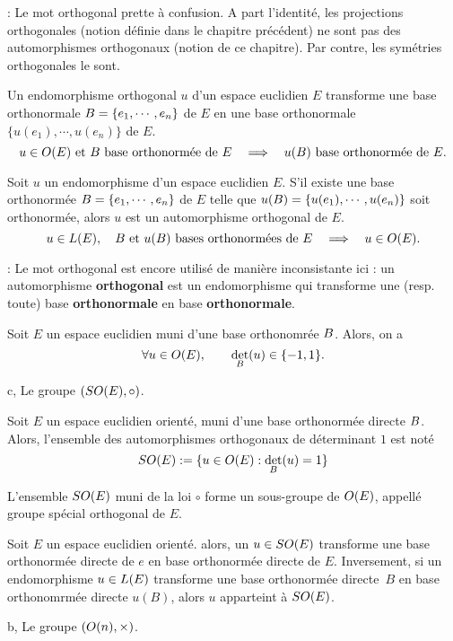  \Remarque : Le mot orthogonal prette à confusion. A part l'identité, les projections orthogonales (notion définie dans le chapitre précédent) ne sont pas des automorphismes orthogonaux (notion de ce chapitre). Par contre, les symétries orthogonales le sont. 
\bigskip

\Propriete []  Un endomorphisme orthogonal $u$ d'un espace euclidien $E$ transforme une base orthonormale $\sc B=\{e_1,\cdots,e_n\}$ de $E$ en une base orthonormale $\{u(e_1),\cdots,u(e_n)\}$ de $E$. 
$$
u\in\sc O(E)\mbox{ et }\sc B\mbox{ base orthonormée de }E\quad \Longrightarrow\quad u(\sc B)\mbox{ base orthonormée de }E.
$$
 

\Propriete []  Soit $u$ un endomorphisme d'un espace euclidien $E$. S'il existe une base orthonormée $\sc B=\{e_1,\cdots,e_n\}$ de $E$ telle que 
$u(\sc B)=\{u(e_1),\cdots,u(e_n)\}$ soit orthonormée, alors $u$ est un automorphisme orthogonal de $E$. 
$$
u\in\sc L(E), \quad \sc B\mbox{ et }u(\sc B)\mbox{ bases orthonormées de }E\quad \Longrightarrow\quad u\in\sc O(E).
$$

 \Remarque :  Le mot orthogonal est encore utilisé de manière inconsistante ici : un automorphisme {\bf orthogonal} est un endomorphisme qui transforme une (resp. toute) base {\bf orthonormale} en base {\bf orthonormale}. 
\bigskip

\Propriete []  Soit $E$ un espace euclidien muni d'une base orthonomrée $\sc B$. Alors, on a 
$$
\forall u\in\sc O(E), \qquad \det_{\sc B}(u)\in\{-1,1\}. 
$$

\Subsection c, Le groupe $(\sc{SO}(E),\circ)$. 

\Definition []  Soit $E$ un espace euclidien orienté, muni d'une base orthonormée directe $\sc B$. 
Alors, l'ensemble des automorphismes orthogonaux de déterminant $1$ est noté 
$$
\sc{SO}(E):=\{u\in\sc O(E):\det_{\sc B}(u)=1\}
$$

\Propriete []  L'ensemble $\sc{SO}(E)$ muni de la loi $\circ$ forme un sous-groupe de $\sc O(E)$, 
appellé groupe spécial orthogonal de $E$. 
\bigskip

\Propriete []  Soit $E$ un espace euclidien orienté. alors, un $u\in\sc{SO}(E)$ transforme 
une base orthonormée directe de $e$ en base orthonormée directe de $E$. \medskip
\noindent
Inversement, si un endomorphisme $u\in\sc L(E)$ transforme une base orthonormée directe~$B$ en base orthonomrmée directe $u(B)$, 
alors $u$ apparteint à $\sc{SO}(E)$. 
\bigskip

\Subsection b, Le groupe $(\sc O(n),\times)$. 


